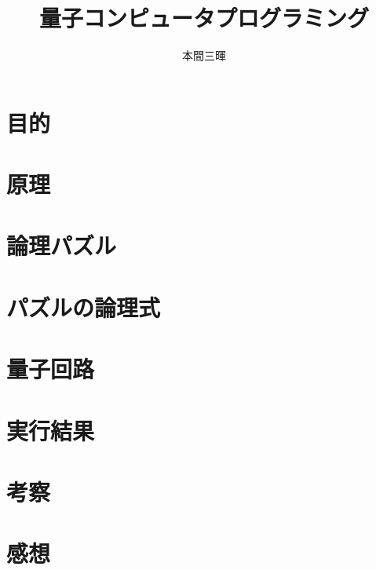 \documentclass[titlepage,a4paper]{jsarticle}
\title{量子コンピュータプログラミング}
\author{本間三暉}
\begin{document}
\maketitle
\section{目的}

\section{原理}
\section{論理パズル}
\section{パズルの論理式}
\section{量子回路}
\section{実行結果}
\section{考察}
\section{感想}
\end{document}
